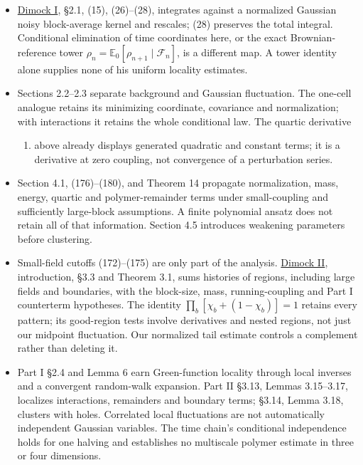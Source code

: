 \documentclass[11pt,a4paper]{article}
\newcommand{\tightlist}{\setlength{\itemsep}{0pt}\setlength{\parskip}{0pt}}
\begin{document}
\begin{itemize}
\tightlist
\item
  \href{../docs/balaban/Dimock_BalabanI_1108.1335v2.md}{Dimock I}, §2.1,
  (15), (26)--(28), integrates against a normalized Gaussian noisy
  block-average kernel and rescales; (28) preserves the total integral.
  Conditional elimination of time coordinates here, or the exact
  Brownian-reference tower
  \(\rho_n=\mathbb E_0[\rho_{n+1}\mid\mathcal F_n]\), is a different
  map. A tower identity alone supplies none of his uniform locality
  estimates.
\item
  Sections 2.2--2.3 separate background and Gaussian fluctuation. The
  one-cell analogue retains its minimizing coordinate, covariance and
  normalization; with interactions it retains the whole conditional law.
  The quartic derivative

  \begin{enumerate}
  \def\labelenumi{(\arabic{enumi})}
  \setcounter{enumi}{18}
  \tightlist
  \item
    above already displays generated quadratic and constant terms; it is
    a derivative at zero coupling, not convergence of a perturbation
    series.
  \end{enumerate}
\item
  Section 4.1, (176)--(180), and Theorem 14 propagate normalization,
  mass, energy, quartic and polymer-remainder terms under small-coupling
  and sufficiently large-block assumptions. A finite polynomial ansatz
  does not retain all of that information. Section 4.5 introduces
  weakening parameters before clustering.
\item
  Small-field cutoffs (172)--(175) are only part of the analysis.
  \href{../docs/balaban/Dimock_BalabanII_1212.5562v2.md}{Dimock II},
  introduction, §3.3 and Theorem 3.1, sums histories of regions,
  including large fields and boundaries, with the block-size, mass,
  running-coupling and Part I counterterm hypotheses. The identity
  \(\prod_b[\chi_b+(1-\chi_b)]=1\) retains every pattern; its
  good-region tests involve derivatives and nested regions, not just our
  midpoint fluctuation. Our normalized tail estimate controls a
  complement rather than deleting it.
\item
  Part I §2.4 and Lemma 6 earn Green-function locality through local
  inverses and a convergent random-walk expansion. Part II §3.13, Lemmas
  3.15--3.17, localizes interactions, remainders and boundary terms;
  §3.14, Lemma 3.18, clusters with holes. Correlated local fluctuations
  are not automatically independent Gaussian variables. The time chain's
  conditional independence holds for one halving and establishes no
  multiscale polymer estimate in three or four dimensions.
\end{itemize}
\end{document}
